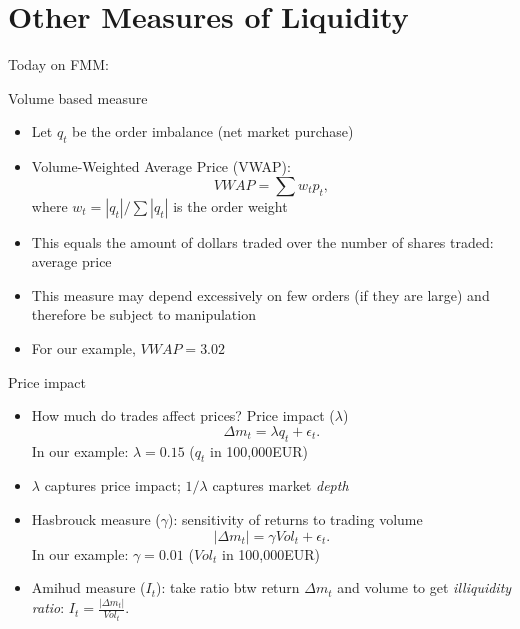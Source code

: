 \documentclass[english,10pt]{beamer}
\begin{document}
\section{Other Measures of Liquidity}

\begin{frame}{Today on FMM:}
	\tableofcontents[currentsection]
\end{frame}


\begin{frame}{Volume based measure}
\begin{itemize}
	\item Let $q_t$ be the order imbalance (net market purchase)
	\item \alert{Volume-Weighted Average Price} (VWAP):
	\[
	VWAP = \sum  w_t p_t,
	\]
	where $w_t = |q_t|/\sum |q_t|$ is the order weight
	\item  This equals the amount of dollars traded over the number of shares traded: average price
	\item This measure may depend excessively on few orders (if they are large) and therefore be subject to manipulation
	\item For our example, $VWAP=3.02$
\end{itemize}
\end{frame}


\begin{frame}{Price impact}
\begin{itemize}
	\item How much do trades affect prices? \alert{Price impact} ($\lambda$)
	\[
	\Delta m_t = \lambda q_t + \epsilon_t.
	\]
	In our example: $\lambda = 0.15 $ ($q_t$ in 100,000EUR)
	\item  $\lambda$ captures price impact;  $1/\lambda$ captures market \textit{depth}
	\item \alert{Hasbrouck measure} ($\gamma$): sensitivity of returns to trading volume
	\[
	|\Delta m_t | = \gamma Vol_t + \epsilon_t.
	\]
	In our example: $\gamma = 0.01$ ($Vol_t$ in 100,000EUR)
	\item \alert{Amihud measure} ($I_t$): take ratio btw return $\Delta m_t$ and volume to get \textit{illiquidity ratio}: 
	\center
	$I_t = \frac{|\Delta m_t|}{Vol_t}$.
\end{itemize}
\end{frame}
\end{document}

